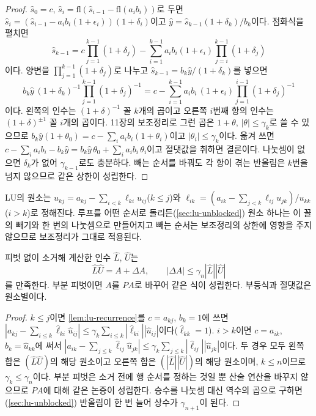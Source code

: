 \begin{proof}
$\hat s_0=c$, $\hat s_i=\mathrm{fl}(\hat s_{i-1}-\mathrm{fl}(a_ib_i))$로 두면 $\hat s_i=(\hat s_{i-1}-a_ib_i(1+\epsilon_i))(1+\delta_i)$이고 $\hat y=\hat s_{k-1}(1+\delta_k)/b_k$이다. 점화식을 펼치면
\[
\hat s_{k-1}=c\prod_{j=1}^{k-1}(1+\delta_j)-\sum_{i=1}^{k-1}a_ib_i(1+\epsilon_i)\prod_{j=i}^{k-1}(1+\delta_j)
\]
이다. 양변을 $\prod_{j=1}^{k-1}(1+\delta_j)$로 나누고 $\hat s_{k-1}=b_k\hat y/(1+\delta_k)$를 넣으면
\[
b_k\hat y\,(1+\delta_k)^{-1}\prod_{j=1}^{k-1}(1+\delta_j)^{-1}=c-\sum_{i=1}^{k-1}a_ib_i\,(1+\epsilon_i)\prod_{j=1}^{i-1}(1+\delta_j)^{-1}
\]
이다. 왼쪽의 인수는 $(1+\delta)^{-1}$ 꼴 $k$개의 곱이고 오른쪽 $i$번째 항의 인수는 $(1+\delta)^{\pm1}$ 꼴 $i$개의 곱이다. 11장의 보조정리로 그런 곱은 $1+\theta$, $|\theta|\le\gamma_k$로 쓸 수 있으므로 $b_k\hat y(1+\theta_0)=c-\sum_ia_ib_i(1+\theta_i)$이고 $|\theta_i|\le\gamma_k$이다. 옮겨 쓰면 $c-\sum_ia_ib_i-b_k\hat y=b_k\hat y\,\theta_0+\sum_ia_ib_i\,\theta_i$이고 절댓값을 취하면 결론이다. 나눗셈이 없으면 $\delta_k$가 없어 $\gamma_{k-1}$로도 충분하다. 빼는 순서를 바꿔도 각 항이 겪는 반올림은 $k$번을 넘지 않으므로 같은 상한이 성립한다.
\end{proof}

LU의 원소는 $u_{kj}=a_{kj}-\sum_{i<k}\ell_{ki}u_{ij}$($k\le j$)와 $\ell_{ik}=(a_{ik}-\sum_{j<k}\ell_{ij}u_{jk})/u_{kk}$($i>k$)로 정해진다. 루프를 어떤 순서로 돌리든(\cref{sec:lu-unblocked}) 원소 하나는 이 꼴의 빼기와 한 번의 나눗셈으로 만들어지고 빼는 순서는 보조정리의 상한에 영향을 주지 않으므로 보조정리가 그대로 적용된다.

\begin{theorem}[Wilkinson]
\label{thm:lu-backward}
피벗 없이 소거해 계산한 인수 $\hat L$, $\hat U$는
\[
\hat L\hat U=A+\Delta A,\qquad|\Delta A|\le\gamma_n|\hat L||\hat U|
\]
를 만족한다. 부분 피벗이면 $A$를 $PA$로 바꾸어 같은 식이 성립한다. 부등식과 절댓값은 원소별이다.
\end{theorem}

\begin{proof}
$k\le j$이면 \cref{lem:lu-recurrence}를 $c=a_{kj}$, $b_k=1$에 쓰면 $|a_{kj}-\sum_{i\le k}\hat\ell_{ki}\hat u_{ij}|\le\gamma_k\sum_{i\le k}|\hat\ell_{ki}||\hat u_{ij}|$이다($\hat\ell_{kk}=1$). $i>k$이면 $c=a_{ik}$, $b_k=\hat u_{kk}$에 써서 $|a_{ik}-\sum_{j\le k}\hat\ell_{ij}\hat u_{jk}|\le\gamma_k\sum_{j\le k}|\hat\ell_{ij}||\hat u_{jk}|$이다. 두 경우 모두 왼쪽 합은 $(\hat L\hat U)$의 해당 원소이고 오른쪽 합은 $(|\hat L||\hat U|)$의 해당 원소이며, $k\le n$이므로 $\gamma_k\le\gamma_n$이다. 부분 피벗은 소거 전에 행 순서를 정하는 것일 뿐 산술 연산을 바꾸지 않으므로 $PA$에 대해 같은 논증이 성립한다. 승수를 나눗셈 대신 역수의 곱으로 구하면(\cref{sec:lu-unblocked}) 반올림이 한 번 늘어 상수가 $\gamma_{n+1}$이 된다.
\end{proof}

